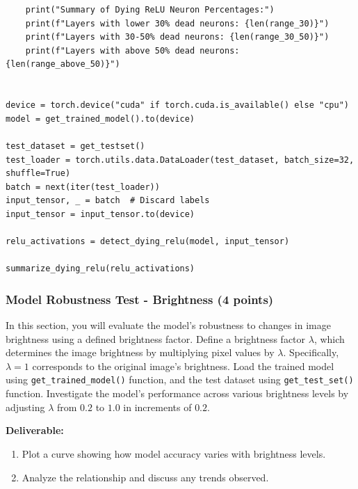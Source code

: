\documentclass[11pt, oneside]{article}   	%
\begin{document}
\begin{verbatim}
    print("Summary of Dying ReLU Neuron Percentages:")
    print(f"Layers with lower 30% dead neurons: {len(range_30)}")
    print(f"Layers with 30-50% dead neurons: {len(range_30_50)}")
    print(f"Layers with above 50% dead neurons: {len(range_above_50)}")


device = torch.device("cuda" if torch.cuda.is_available() else "cpu")
model = get_trained_model().to(device)

test_dataset = get_testset()
test_loader = torch.utils.data.DataLoader(test_dataset, batch_size=32, shuffle=True)
batch = next(iter(test_loader))
input_tensor, _ = batch  # Discard labels
input_tensor = input_tensor.to(device)

relu_activations = detect_dying_relu(model, input_tensor)

summarize_dying_relu(relu_activations)
\end{verbatim}

\newpage

\subsubsection*{Model Robustness Test - Brightness (4 points)}
In this section, you will evaluate the model's robustness to changes in image brightness using a defined brightness factor.
Define a brightness factor $\lambda$, which determines the image brightness by multiplying pixel values by $\lambda$. Specifically, $\lambda = 1$ corresponds to the original image's brightness.
Load the trained model using \texttt{get\_trained\_model()} function, and the test dataset using \texttt{get\_test\_set()} function.  Investigate the model's performance across various brightness levels by adjusting $\lambda$ from $0.2$ to $1.0$ in increments of $0.2$. 

\noindent\textbf{Deliverable:}

\begin{enumerate}
    \item Plot a curve showing how model accuracy varies with brightness levels.
    \item Analyze the relationship and discuss any trends observed.
\end{enumerate}
\end{document}
